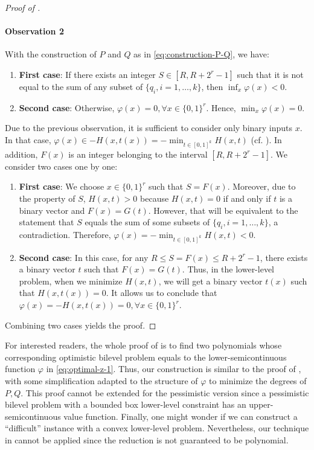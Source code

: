 \documentclass{article}
\newcommand{\valbilevel}{\varphi}
\theoremstyle{plain}
\theoremstyle{definition}
\begin{document}
\begin{proof}[Proof of {}]
    \paragraph{Observation 2} With the construction of $P$ and $Q$ as in \eqref{eq:construction-P-Q}, we have:
    \begin{enumerate}
        \item \textbf{First case}: If there exists an integer $S \in [R, R + 2^r - 1]$ such that it is not equal to the sum of any subset of $\{q_i, i = 1, \ldots, k\}$, then  $\inf_x \valbilevel(x) < 0$. 
        \item \textbf{Second case}: Otherwise, $\valbilevel(x) = 0, \forall x \in \{0,1\}^{r}$. Hence, $\min_x \valbilevel(x) = 0$.
    \end{enumerate}
    Due to the previous observation, it is sufficient to consider only binary inputs $x$. In that case, $\valbilevel(x) \in -H(x,t(x)) = -\min_{t \in [0,1]^k} H(x,t)$ (cf. ).
    In addition, $F(x)$ is an integer belonging to the interval $[R, R + 2^r - 1]$. We consider two cases one by one:
    \begin{enumerate}[leftmargin=*]
        \item \textbf{First case}: We choose $x \in \{0,1\}^r$ such that $S = F(x)$. Moreover, due to the property of $S$, $H(x,t) > 0$ because $H(x,t) = 0$ if and only if $t$ is a binary vector and $F(x) = G(t)$. However, that will be equivalent to the statement that $S$ equals the sum of some subsets of $\{q_i, i = 1, \ldots, k\}$, a contradiction. Therefore, $\valbilevel(x) = -\min_{t \in [0,1]^k} H(x,t) < 0$. 
        \item \textbf{Second case}: In this case, for any $R \leq S = F(x) \leq R + 2^r - 1$, there exists a binary vector $t$ such that $F(x) = G(t)$. Thus, in the lower-level problem, when we minimize $H(x,t)$, we will get a binary vector $t(x)$ such that $H(x,t(x)) = 0$. It allows us to conclude that $\valbilevel(x) = -H(x,t(x)) = 0, \forall x\in\{0,1\}^r$.   
    \end{enumerate}
    Combining two cases yields the proof.
\end{proof}
For interested readers, the whole proof of  is to find two polynomials whose corresponding optimistic bilevel problem equals to the lower-semicontinuous function $\valbilevel$ in \eqref{eq:optimal-z-1}. Thus, our construction is similar to the proof of , with some simplification adapted to the structure of $\valbilevel$ to minimize the degrees of $P,Q$. This proof cannot be extended for the pessimistic version since a pessimistic bilevel problem with a bounded box lower-level constraint has an upper-semicontinuous value function. Finally, one might wonder if we can construct a ``difficult'' instance with a convex lower-level problem. Nevertheless, our technique in  cannot be applied since the reduction is not guaranteed to be polynomial.
\end{document}
